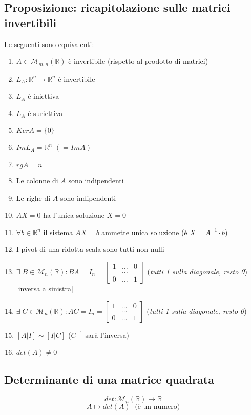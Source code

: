 \subsection{Proposizione: ricapitolazione sulle matrici invertibili}
Le seguenti sono equivalenti:
\begin{enumerate}
	\item $A\in\mathcal{M}_{m,n}(\mathbb{R})$ è invertibile (rispetto al prodotto di matrici)
	\item $L_A:\mathbb{R}^n\rightarrow\mathbb{R}^n$ è invertibile
	\item $L_A$ è iniettiva
	\item $L_A$ è suriettiva
	\item $KerA=\{0\}$
	\item $ImL_A=\mathbb{R}^n$ $(=ImA)$
	\item $rgA=n$
	\item Le colonne di $A$ sono indipendenti
	\item Le righe di $A$ sono indipendenti
	\item $AX=\underline{0}$ ha l'unica soluzione $X=\underline{0}$
	\item $\forall\underline{b}\in\mathbb{R}^n$ il sistema $AX=\underline{b}$ ammette unica soluzione (è $X=A^{-1}\cdot\underline{b}$)
	\item I pivot di una ridotta scala sono tutti non nulli
	\item $\exists\;B\in\mathcal{M}_n(\mathbb{R}):BA=I_n=\begin{bmatrix}1&\dots&0 \\&\dots&\\0&\dots&1\end{bmatrix}$ (\textit{tutti 1 sulla diagonale, resto 0}) [inversa a sinistra]
	\item $\exists\;C\in\mathcal{M}_n(\mathbb{R}):AC=I_n=\begin{bmatrix}1&\dots&0 \\&\dots&\\0&\dots&1\end{bmatrix}$ (\textit{tutti 1 sulla diagonale, resto 0})
	\item $[A|I]\sim[I|C]$ ($C^{-1}$ sarà l'inversa)
	\item $det(A)\neq 0$
\end{enumerate}

\subsection{Determinante di una matrice quadrata}
\[det: \mathcal{M}_n(\mathbb{R})\rightarrow\mathbb{R}\]
\[A\mapsto det(A)\;\text{ (è un numero)}\]

